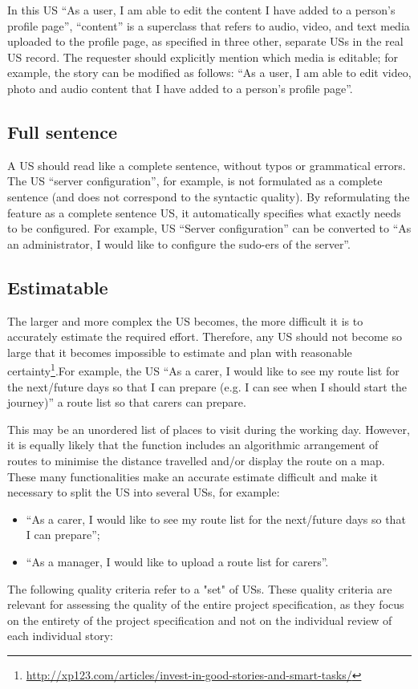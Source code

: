 In this US \enquote{As a user, I am able to edit the content I have added to a person's profile page}, \enquote{content} is a superclass that refers to audio, video, and text media uploaded to the profile page, as specified in three other, separate USs in the real US record. The requester should explicitly mention which media is editable; for example, the story can be modified as follows: \enquote{As a user, I am able to edit video, photo and audio content that I have added to a person's profile page}.
\subsection*{\normalsize{Full sentence}}
A US should read like a complete sentence, without typos or grammatical errors. The US \enquote{server configuration}, for example, is not formulated as a complete sentence (and does not correspond to the syntactic quality). By reformulating the feature as a complete sentence US, it automatically specifies what exactly needs to be configured. For example, US \enquote{Server configuration} can be converted to \enquote{As an administrator, I would like to configure the sudo-ers of the server}.
\subsection*{\normalsize{Estimatable}}
The larger and more complex the US becomes, the more difficult it is to accurately estimate the required effort. Therefore, any US should not become so large that it becomes impossible to estimate and plan with reasonable certainty\footnote{\href{http://xp123.com/articles/invest-in-good-stories-and-smart-tasks/}{http://xp123.com/articles/invest-in-good-stories-and-smart-tasks/}}.For example, the US \enquote{As a carer, I would like to see my route list for the next/future days so that I can prepare (e.g. I can see when I should start the journey)} a route list so that carers can prepare.

This may be an unordered list of places to visit during the working day. However, it is equally likely that the function includes an algorithmic arrangement of routes to minimise the distance travelled and/or display the route on a map. These many functionalities make an accurate estimate difficult and make it necessary to split the US into several USs, for example:
\begin{itemize}
\item \enquote{As a carer, I would like to see my route list for the next/future days so that I can prepare};
\item \enquote{As a manager, I would like to upload a route list for carers}.
\end{itemize}
The following quality criteria refer to a "set" of USs. These quality criteria are relevant for assessing the quality of the entire project specification, as they focus on the entirety of the project specification and not on the individual review of each individual story:

